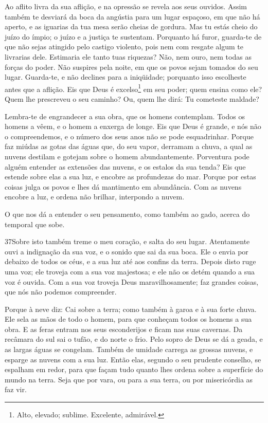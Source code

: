 Ao aflito livra da sua aflição, e na opressão se revela aos seus
ouvidos. Assim também te desviará da boca da angústia para um
lugar espaçoso, em que não há aperto, e as iguarias da tua mesa
serão cheias de gordura. Mas tu estás cheio do juízo do
ímpio; o juízo e a justiça te sustentam. Porquanto há furor,
guarda-te de que não sejas atingido pelo castigo violento, pois nem
com resgate algum te livrarias dele. Estimaria ele tanto tuas
riquezas? Não, nem ouro, nem todas as forças do poder. Não
suspires pela noite, em que os povos sejam tomados do seu lugar.
Guarda-te, e não declines para a iniqüidade; porquanto isso
escolheste antes que a aflição. Eis que Deus é
excelso\footnote{Alto, elevado; sublime. Excelente, admirável.} em
seu poder; quem ensina como ele? Quem lhe prescreveu o seu
caminho? Ou, quem lhe dirá: Tu cometeste maldade?

Lembra-te de engrandecer a sua obra, que os homens contemplam.
Todos os homens a vêem, e o homem a enxerga de longe.
Eis que Deus é grande, e nós não o compreendemos, e o número
dos seus anos não se pode esquadrinhar. Porque faz miúdas as
gotas das águas que, do seu vapor, derramam a chuva, a qual
as nuvens destilam e gotejam sobre o homem abundantemente.
Porventura pode alguém entender as extensões das nuvens, e os
estalos da sua tenda? Eis que estende sobre elas a sua luz, e
encobre as profundezas do mar. Porque por estas coisas julga
os povos e lhes dá mantimento em abundância. Com as nuvens
encobre a luz, e ordena não brilhar, interpondo a nuvem.

O que nos dá a entender o seu pensamento, como também ao gado,
acerca do temporal que sobe.

\medskip

\lettrine{37} Sobre isto também treme o meu coração, e salta
do seu lugar. Atentamente ouvi a indignação da sua voz, e o
sonido que sai da sua boca. Ele o envia por debaixo de todos os
céus, e a sua luz até aos confins da terra. Depois disto ruge
uma voz; ele troveja com a sua voz majestosa; e ele não os detém
quando a sua voz é ouvida. Com a sua voz troveja Deus
maravilhosamente; faz grandes coisas, que nós não podemos
compreender.

Porque à neve diz: Cai sobre a terra; como também à garoa e à sua
forte chuva. Ele sela as mãos de todo o homem, para que conheçam
todos os homens a sua obra. E as feras entram nos seus
esconderijos e ficam nas suas cavernas. Da recâmara do sul sai o
tufão, e do norte o frio. Pelo sopro de Deus se dá a geada, e
as largas águas se congelam. Também de umidade carrega as
grossas nuvens, e esparge as nuvens com a sua luz. Então
elas, segundo o seu prudente conselho, se espalham em redor, para
que façam tudo quanto lhes ordena sobre a superfície do mundo na
terra. Seja que por vara, ou para a sua terra, ou por
misericórdia as faz vir.

